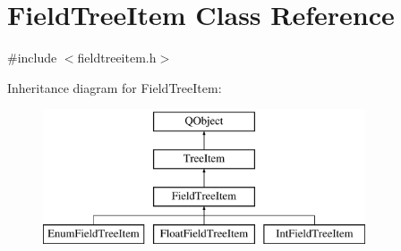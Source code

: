 \hypertarget{class_field_tree_item}{\section{Field\-Tree\-Item Class Reference}
\label{class_field_tree_item}
}


{\ttfamily \#include $<$fieldtreeitem.\-h$>$}

Inheritance diagram for Field\-Tree\-Item\-:\begin{figure}[H]
\begin{center}
\leavevmode
\includegraphics[height=4.000000cm]{class_field_tree_item}
\end{center}
\end{figure}
